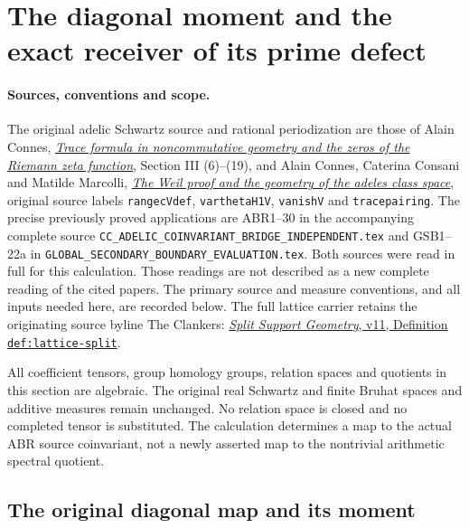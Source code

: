 \section{The diagonal moment and the exact receiver of its prime defect}
\label{sec:diagonal-moment-refined-receiver}

\paragraph{Sources, conventions and scope.}
The original adelic Schwartz source and rational periodization are those
of Alain Connes,
\href{https://arxiv.org/abs/math/9811068v1}{\emph{Trace formula in
noncommutative geometry and the zeros of the Riemann zeta function}},
Section III (6)--(19), and Alain Connes, Caterina Consani and Matilde
Marcolli,
\href{https://arxiv.org/abs/math/0703392v1}{\emph{The Weil proof and
the geometry of the adeles class space}}, original source labels
\texttt{rangecVdef}, \texttt{varthetaH1V}, \texttt{vanishV} and
\texttt{tracepairing}. The precise previously proved applications are
ABR1--30 in the accompanying complete source
\nolinkurl{CC_ADELIC_COINVARIANT_BRIDGE_INDEPENDENT.tex} and GSB1--22a
in \nolinkurl{GLOBAL_SECONDARY_BOUNDARY_EVALUATION.tex}.
Both sources were read in full for this calculation. Those readings
are not described as a new complete reading of the cited papers.
The primary source and measure conventions, and all inputs needed
here, are recorded below. The full lattice carrier retains the
originating source byline The Clankers:
\href{https://github.com/KokunoYumeto/zeta-function-research-reader/blob/a2851f9eb352e7e4376bc629de86fa4ed9c1c434/workbenches/splitzero-tandem/foundations/split-support-geometry-v11/split_support_geometry_arithmetic_curve_v11.tex}{\emph{Split Support Geometry}, v11,
Definition \texttt{def:lattice-split}}.

All coefficient tensors, group homology groups, relation spaces and
quotients in this section are algebraic. The original real Schwartz
and finite Bruhat spaces and additive measures remain unchanged.
No relation space is closed and no completed tensor is substituted.
The calculation determines a map to the actual ABR source coinvariant,
not a newly asserted map to the nontrivial arithmetic spectral quotient.

\subsection{The original diagonal map and its moment}


